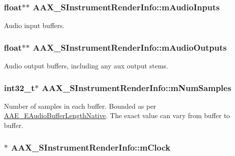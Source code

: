 \subsubsection[{m\+Audio\+Inputs}]{\setlength{\rightskip}{0pt plus 5cm}float$\ast$$\ast$ A\+A\+X\+\_\+\+S\+Instrument\+Render\+Info\+::m\+Audio\+Inputs}\label{a00123_a84a9670391f6c3ade12f8577e3c127a7}


Audio input buffers. 

\hypertarget{a00123_a24be01ad79dac3d110302a4392a8c8cc}{}
\subsubsection[{m\+Audio\+Outputs}]{\setlength{\rightskip}{0pt plus 5cm}float$\ast$$\ast$ A\+A\+X\+\_\+\+S\+Instrument\+Render\+Info\+::m\+Audio\+Outputs}\label{a00123_a24be01ad79dac3d110302a4392a8c8cc}


Audio output buffers, including any aux output stems. 

\hypertarget{a00123_a7668a9950721f0a2819bee60fafc8e10}{}
\subsubsection[{m\+Num\+Samples}]{\setlength{\rightskip}{0pt plus 5cm}int32\+\_\+t$\ast$ A\+A\+X\+\_\+\+S\+Instrument\+Render\+Info\+::m\+Num\+Samples}\label{a00123_a7668a9950721f0a2819bee60fafc8e10}


Number of samples in each buffer. Bounded as per \hyperlink{a00206_aa1769ee466fd07659d8c7ef5ac61cd49}{A\+A\+E\+\_\+\+E\+Audio\+Buffer\+Length\+Native}. The exact value can vary from buffer to buffer. 

\hypertarget{a00123_a4db77b69a4d4993b0fa6a5ab3573eb05}{}
\subsubsection[{m\+Clock}]{$\ast$ A\+A\+X\+\_\+\+S\+Instrument\+Render\+Info\+::m\+Clock}\label{a00123_a4db77b69a4d4993b0fa6a5ab3573eb05}


